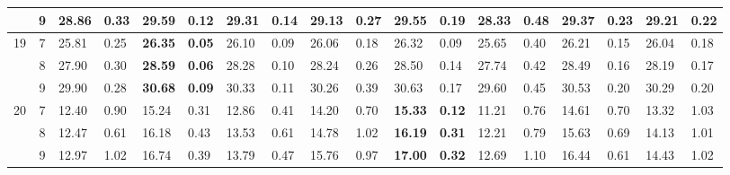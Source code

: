 \documentclass[conference]{IEEEtran}
\begin{document}
\begin{table}[]
\begin{tabular}{|cc|ll|ll|ll|ll|ll|ll|ll|ll|}
		\multicolumn{1}{|c|}{} & 9 & \multicolumn{1}{l|}{28.86} & 0.33 & \multicolumn{1}{l|}{\textbf{29.59}} & \textbf{0.12} & \multicolumn{1}{l|}{29.31} & 0.14 & \multicolumn{1}{l|}{29.13} & 0.27 & \multicolumn{1}{l|}{29.55} & 0.19 & \multicolumn{1}{l|}{28.33} & 0.48 & \multicolumn{1}{l|}{29.37} & 0.23 & \multicolumn{1}{l|}{29.21} & 0.22 \\ \hline
		\multicolumn{1}{|c|}{\multirow{3}{*}{19}} & 7 & \multicolumn{1}{l|}{25.81} & 0.25 & \multicolumn{1}{l|}{\textbf{26.35}} & \textbf{0.05} & \multicolumn{1}{l|}{26.10} & 0.09 & \multicolumn{1}{l|}{26.06} & 0.18 & \multicolumn{1}{l|}{26.32} & 0.09 & \multicolumn{1}{l|}{25.65} & 0.40 & \multicolumn{1}{l|}{26.21} & 0.15 & \multicolumn{1}{l|}{26.04} & 0.18 \\ \cline{2-18} 
		\multicolumn{1}{|c|}{} & 8 & \multicolumn{1}{l|}{27.90} & 0.30 & \multicolumn{1}{l|}{\textbf{28.59}} & \textbf{0.06} & \multicolumn{1}{l|}{28.28} & 0.10 & \multicolumn{1}{l|}{28.24} & 0.26 & \multicolumn{1}{l|}{28.50} & 0.14 & \multicolumn{1}{l|}{27.74} & 0.42 & \multicolumn{1}{l|}{28.49} & 0.16 & \multicolumn{1}{l|}{28.19} & 0.17 \\ \cline{2-18} 
		\multicolumn{1}{|c|}{} & 9 & \multicolumn{1}{l|}{29.90} & 0.28 & \multicolumn{1}{l|}{\textbf{30.68}} & \textbf{0.09} & \multicolumn{1}{l|}{30.33} & 0.11 & \multicolumn{1}{l|}{30.26} & 0.39 & \multicolumn{1}{l|}{30.63} & 0.17 & \multicolumn{1}{l|}{29.60} & 0.45 & \multicolumn{1}{l|}{30.53} & 0.20 & \multicolumn{1}{l|}{30.29} & 0.20 \\ \hline
		\multicolumn{1}{|c|}{\multirow{3}{*}{20}} & 7 & \multicolumn{1}{l|}{12.40} & 0.90 & \multicolumn{1}{l|}{15.24} & 0.31 & \multicolumn{1}{l|}{12.86} & 0.41 & \multicolumn{1}{l|}{14.20} & 0.70 & \multicolumn{1}{l|}{\textbf{15.33}} & \textbf{0.12} & \multicolumn{1}{l|}{11.21} & 0.76 & \multicolumn{1}{l|}{14.61} & 0.70 & \multicolumn{1}{l|}{13.32} & 1.03 \\ \cline{2-18} 
		\multicolumn{1}{|c|}{} & 8 & \multicolumn{1}{l|}{12.47} & 0.61 & \multicolumn{1}{l|}{16.18} & 0.43 & \multicolumn{1}{l|}{13.53} & 0.61 & \multicolumn{1}{l|}{14.78} & 1.02 & \multicolumn{1}{l|}{\textbf{16.19}} & \textbf{0.31} & \multicolumn{1}{l|}{12.21} & 0.79 & \multicolumn{1}{l|}{15.63} & 0.69 & \multicolumn{1}{l|}{14.13} & 1.01 \\ \cline{2-18} 
		\multicolumn{1}{|c|}{} & 9 & \multicolumn{1}{l|}{12.97} & 1.02 & \multicolumn{1}{l|}{16.74} & 0.39 & \multicolumn{1}{l|}{13.79} & 0.47 & \multicolumn{1}{l|}{15.76} & 0.97 & \multicolumn{1}{l|}{\textbf{17.00}} & \textbf{0.32} & \multicolumn{1}{l|}{12.69} & 1.10 & \multicolumn{1}{l|}{16.44} & 0.61 & \multicolumn{1}{l|}{14.43} & 1.02 \\ \hline
	\end{tabular}
\end{table}
\end{document}
